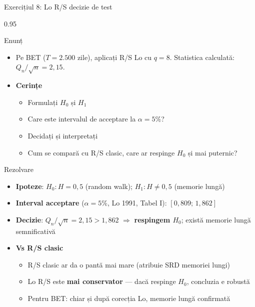 \documentclass[9pt, aspectratio=169, t]{beamer}
\begin{document}
\begin{frame}[shrink=15]{Exercițiul 8: Lo R/S decizie de test}
\begin{cminipage}{0.95\textwidth}
\begin{block}{Enunț}
\begin{itemize}\setlength{\itemsep}{0pt}
    \item Pe BET ($T=2.500$ zile), aplicați R/S Lo cu $q=8$. Statistica calculată: $Q_n/\sqrt n=2{,}15$.
\end{itemize}
\end{block}
\begin{itemize}\setlength{\itemsep}{0pt}
    \item \textbf{Cerințe}
    \begin{itemize}\setlength{\itemsep}{0pt}
        \item Formulați $H_0$ și $H_1$
        \item Care este intervalul de acceptare la $\alpha=5\%$?
        \item Decidați și interpretați
        \item Cum se compară cu R/S clasic, care ar respinge $H_0$ și mai puternic?
    \end{itemize}
\end{itemize}
\begin{exampleblock}{Rezolvare}
\begin{itemize}\setlength{\itemsep}{0pt}
    \item \textbf{Ipoteze}: $H_0: H=0{,}5$ (random walk); $H_1: H\neq 0{,}5$ (memorie lungă)
    \item \textbf{Interval acceptare} ($\alpha=5\%$, Lo 1991, Tabel I): $[0{,}809;\,1{,}862]$
    \item \textbf{Decizie}: $Q_n/\sqrt n=2{,}15>1{,}862$ $\Rightarrow$ \textbf{respingem $H_0$}; există memorie lungă semnificativă
    \item \textbf{Vs R/S clasic}
    \begin{itemize}\setlength{\itemsep}{0pt}
        \item R/S clasic ar da o pantă mai mare (atribuie SRD memoriei lungi)
        \item Lo R/S este \textbf{mai conservator} --- dacă respinge $H_0$, concluzia e robustă
        \item Pentru BET: chiar și după corecția Lo, memorie lungă confirmată
    \end{itemize}
\end{itemize}
\end{exampleblock}
\end{cminipage}
\end{frame}
\end{document}
